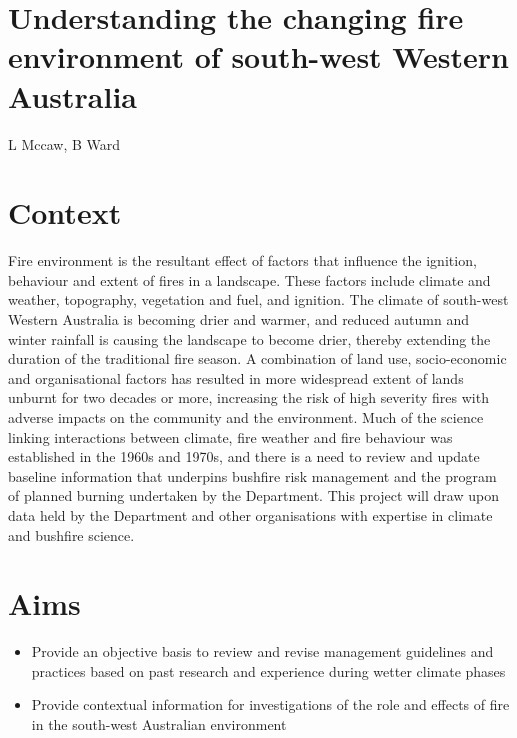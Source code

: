 \documentclass[version=last,
    paper=a4, %
    10pt, %
    usenames,
    dvipsnames,
    oneside, %
    headings=openany, %
    DIV=15 %
]{scrbook}
\begin{document}
\section*{Understanding the changing fire environment of south-west Western
Australia
}

L Mccaw, B Ward


\section*{Context}
Fire environment is the resultant effect of factors that influence the
ignition, behaviour and extent of fires in a landscape. These factors
include climate and weather, topography, vegetation and fuel, and
ignition. The climate of south-west Western Australia is becoming drier
and warmer, and reduced autumn and winter rainfall is causing the
landscape to become drier, thereby extending the duration of the
traditional fire season. A combination of land use, socio-economic and
organisational factors has resulted in more widespread extent of lands
unburnt for two decades or more, increasing the risk of high severity
fires with adverse impacts on the community and the environment. Much of
the science linking interactions between climate, fire weather and fire
behaviour was established in the 1960s and 1970s, and there is a need to
review and update baseline information that underpins bushfire risk
management and the program of planned burning undertaken by the
Department. This project will draw upon data held by the Department and
other organisations with expertise in climate and bushfire science.



\section*{Aims}
\begin{itemize}
\itemsep1pt\parskip0pt
\item
  Provide an objective basis to review and revise management guidelines
  and practices based on past research and experience during wetter
  climate phases
\item
  Provide contextual information for investigations of the role and
  effects of fire in the south-west Australian environment
\end{itemize}
\end{document}
